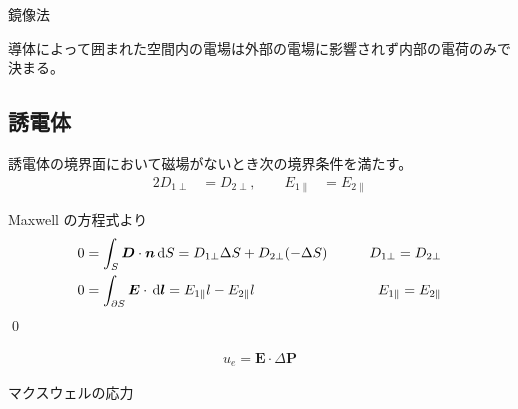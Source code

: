 \documentclass[uplatex,dvipdfmx,a4paper,11pt]{jlreq}
\makeatletter
\newcommand{\EE}{\bm{E}}
\newcommand{\DD}{\bm{D}}
\numberwithin{equation}{section}
\theoremstyle{definition}
\renewenvironment{proof}[1][\proofname]{\par
  \normalfont
  \topsep6\p@\@plus6\p@ \trivlist
  \item[\hskip\labelsep{\bfseries #1}\@addpunct{\bfseries}]\ignorespaces\quad\par
}{%
  \qed\endtrivlist\@endpefalse
}
\renewcommand\proofname{証明}
\makeatother
\begin{document}
\begin{proposition}[半無限導体と点電荷]
  鏡像法
\end{proposition}

\begin{proposition}[一様外部電場中の導体球]
\end{proposition}

\begin{definition}[静電遮蔽]
  導体によって囲まれた空間内の電場は外部の電場に影響されず内部の電荷のみで決まる。
\end{definition}


\subsection{誘電体}
\begin{theorem}[境界条件]
  誘電体の境界面において磁場がないとき次の境界条件を満たす。
  \begin{alignat}{2}
    D_{1\perp} & = D_{2\perp}, \qquad E_{1\parallel} & = E_{2\parallel}
  \end{alignat}
\end{theorem}
\begin{proof}
  Maxwell の方程式より
  \begin{alignat}{2}
    0 & = \int_S\DD\cdot\bm{n}\dl{S} = D_{1\perp}\Delta S + D_{2\perp}(-\Delta S)  \qquad & D_{1\perp} = D_{2\perp}         \\
    0 & = \int_{\partial S}\EE\cdot\dl{\bm{l}} = E_{1\parallel}l - E_{2\parallel}l \qquad & E_{1\parallel} = E_{2\parallel}
  \end{alignat}
\end{proof}

\begin{theorem}[誘電体のエネルギー]
  \begin{align}
    u_e = \EE\cdot\Delta \bm{P}
  \end{align}
\end{theorem}

\begin{theorem}
  マクスウェルの応力
\end{theorem}

\begin{proposition}[真電荷の周囲を誘電体で囲む]

\end{proposition}
\begin{proposition}[コンデンサーの極板]

\end{proposition}
\end{document}
